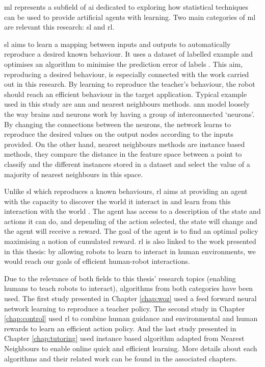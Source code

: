 \gls{ml} represents a subfield of \gls{ai} dedicated to exploring how statistical techniques can be used to provide artificial agents with learning. Two main categories of \gls{ml} are relevant this research: \gls{sl} and \gls{rl}.

\gls{sl} aims to learn a mapping between inputs and outputs to automatically reproduce a desired known behaviour. It uses a dataset of labelled example and optimises an algorithm to minimise the prediction error of labels \citep{russell2016artificial}. This aim, reproducing a desired behaviour, is especially connected with the work carried out in this research. By learning to reproduce the teacher's behaviour, the robot should reach an efficient behaviour in the target application. Typical example used in this study are \gls{ann} and nearest neighbours methods. \gls{ann} model loosely the way brains and neurons work by having a group of interconnected `neurons'. By changing the connections between the neurons, the network learns to reproduce the desired values on the output nodes according to the inputs provided. On the other hand, nearest neighbours methods are instance based methods, they compare the distance in the feature space between a point to classify and the different instances stored in a dataset and select the value of a majority of nearest neighbours in this space.

Unlike \gls{sl} which reproduces a known behaviours, \gls{rl} aims at providing an agent with the capacity to discover the world it interact in and learn from this interaction with the world \citep{sutton1998reinforcement}. The agent has access to a description of the state and actions it can do, and depending of the action selected, the state will change and the agent will receive a reward. The goal of the agent is to find an optimal policy maximising a notion of cumulated reward. \gls{rl} is also linked to the work presented in this thesis: by allowing robots to learn to interact in human environments, we would reach our goals of efficient human-robot interactions.

Due to the relevance of both fields to this thesis' research topics (enabling humans to teach robots to interact), algorithms from both categories have been used. The first study presented in Chapter \ref{chap:woz} used a feed forward neural network learning to reproduce a teacher policy. The second study in Chapter \ref{chap:control} used \gls{rl} to combine human guidance and environmental and human rewards to learn an efficient action policy. And the last study presented in Chapter \ref{chap:tutoring} used instance based algorithm adapted from Nearest Neighbours to enable online quick and efficient learning. More details about each algorithms and their related work can be found in the associated chapters.

